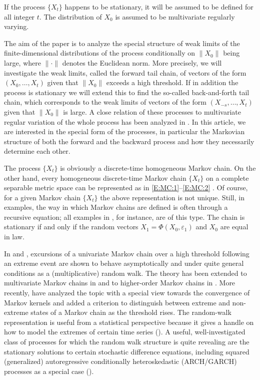 \documentclass{aptpubarxiv}
\numberwithin{equation}{section}
\begin{document}
If the process $\{ X_t \}$ happens to be stationary, it will be assumed to be defined for all integer $t$. The distribution of $X_0$ is assumed to be multivariate regularly varying.

The aim of the paper is to analyze the special structure of weak limits of the finite-dimensional distributions of the process conditionally on $\|X_0\|$ being large, where $\|\cdot\|$ denotes the Euclidean norm. More precisely, we will investigate the weak limits, called the forward tail chain, of vectors of the form $(X_0, \ldots, X_t)$ given that $\|X_0\|$ exceeds a high threshold. If in addition the process is stationary we will extend this to find the so-called back-and-forth tail chain, which corresponds to the weak limits of vectors of the form $(X_{-s}, \ldots, X_t)$ given that $\|X_0\|$ is large. A close relation of these processes to multivariate regular variation of the whole process has been analyzed in \citet{BS09}. In this article, we are interested in the special form of the processes, in particular the Markovian structure of both the forward and the backward process and how they necessarily determine each other.

The process $\{ X_t \}$ is obviously a discrete-time homogeneous Markov chain. On the other hand, every homogeneous discrete-time Markov chain $\{ X_t \}$ on a complete separable metric space can be represented as in \eqref{E:MC:1}--\eqref{E:MC:2} \citep{Ki86}. Of course, for a given Markov chain $\{ X_t \}$ the above representation is not unique. Still, in examples, the way in which Markov chains are defined is often through a recursive equation; all examples in \citet[][pp.~126--127]{Goldie91}, for instance, are of this type. The chain is stationary if and only if the random vectors $X_1 = \Phi(X_0, {\varepsilon}_1)$ and $X_0$ are equal in law.

In \citet{Smith92} and \citet{Perfekt94}, excursions of a univariate Markov chain over a high threshold following an extreme event are shown to behave asymptotically and under quite general conditions as a (multiplicative) random walk. The theory has been extended to multivariate Markov chains in \citet{Perfekt97} and to higher-order Markov chains in \citet{Yun98, Yun00}. More recently, \citet{ReZe13} have analyzed the topic with a special view towards the convergence of Markov kernels and added a criterion to distinguish between extreme and non-extreme states of a Markov chain as the threshold rises. The random-walk representation is useful from a statistical perspective because it gives a handle on how to model the extremes of certain time series (\citet{BC00, CST97, STC97}). A useful, well-investigated class of processes for which the random walk structure is quite revealing are the stationary solutions to certain stochastic difference equations, including squared (generalized) autoregressive 
conditionally heteroskedastic (ARCH/GARCH) processes as a special case (\citet{BDM02b, GdHP04, dHRRdV89}). 
\end{document}
